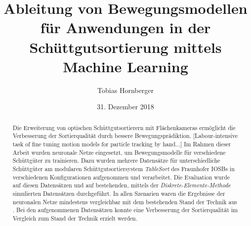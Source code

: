 \documentclass[german]{isasthesis}
\title{Ableitung von Bewegungsmodellen für Anwendungen in der Schüttgutsortierung mittels Machine Learning}
\author{Tobias Hornberger}
\date{31. Dezember 2018}
\begin{document}
    \maketitle

    \begin{abstract}
    Die Erweiterung von optischen Schüttgutsortierern mit Flächenkameras ermöglicht die Verbesserung der Sortierqualität durch bessere Bewegungsprädiktion.
    [Labour-intensive task of fine tuning motion models for particle tracking by hand...]
    Im Rahmen dieser Arbeit wurden neuronale Netze eingesetzt, um Bewegungsmodelle für verschiedene Schüttgüter zu trainieren.
    Dazu wurden mehrere Datensätze für unterschiedliche Schüttgüter 
    am modularen Schüttgutsortiersystem \textit{TableSort} des Fraunhofer IOSBs in verschiedenen Konfigurationen aufgenommen und verarbeitet.
    Die Evaluation wurde auf diesen Datensätzen und auf bestehenden, mittels der \textit{Diskrete-Elemente-Methode} simulierten Datensätzen durchgeführt.
    In allen Szenarien waren die Ergebnisse der neuronalen Netze mindestens vergleichbar mit dem bestehenden Stand der Technik aus \cite{Pfaff2018}.
    Bei den aufgenommenen Datensätzen konnte eine Verbesserung der Sortierqualität im Vergleich zum Stand der Technik erzielt werden. 
    \end{abstract}

    \maketoc

    
    
    
    
    
    
    


	\cleardoublepage
    \printbibliography %


    \appendix
    
\end{document}
